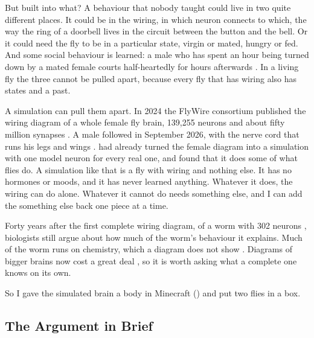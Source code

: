 \documentclass[11pt,a4paper]{article}
\begin{document}
But built into what? A behaviour that nobody taught could live in two quite different places. It could be in the wiring, in which neuron connects to which, the way the ring of a doorbell lives in the circuit between the button and the bell. Or it could need the fly to be in a particular state, virgin or mated, hungry or fed. And some social behaviour is learned: a male who has spent an hour being turned down by a mated female courts half-heartedly for hours afterwards \citep{siegel1979conditioned}. In a living fly the three cannot be pulled apart, because every fly that has wiring also has states and a past.

A simulation can pull them apart. In 2024 the FlyWire consortium published the wiring diagram of a whole female fly brain, 139{,}255 neurons and about fifty million synapses \citep{dorkenwald2024neuronal}. A male followed in September 2026, with the nerve cord that runs his legs and wings \citep{berg2026sexual}. \citet{shiu2024drosophila} had already turned the female diagram into a simulation with one model neuron for every real one, and found that it does some of what flies do. A simulation like that is a fly with wiring and nothing else. It has no hormones or moods, and it has never learned anything. Whatever it does, the wiring can do alone. Whatever it cannot do needs something else, and I can add the something else back one piece at a time.

Forty years after the first complete wiring diagram, of a worm with 302 neurons \citep{white1986structure}, biologists still argue about how much of the worm's behaviour it explains. Much of the worm runs on chemistry, which a diagram does not show \citep{bargmann2013connectome}. Diagrams of bigger brains now cost a great deal \citep{microns2025functional}, so it is worth asking what a complete one knows on its own.

So I gave the simulated brain a body in Minecraft () and put two flies in a box.

\subsection{The Argument in Brief}
\label{sec:brief}
\end{document}
